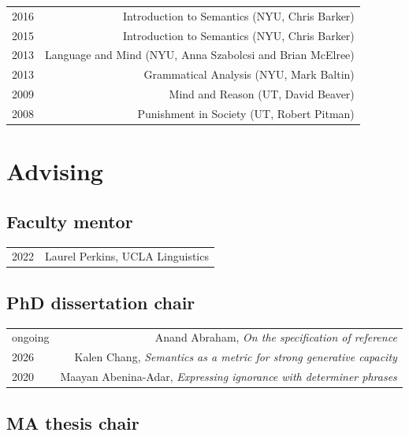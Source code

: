 \documentclass[12pt]{article}
\begin{document}
\begin{longtable}{LR}
  2016 & Introduction to Semantics (NYU, Chris Barker)
         \\
  2015 & Introduction to Semantics (NYU, Chris Barker)
         \\
  2013 & Language and Mind (NYU, Anna Szabolcsi and Brian McElree)
         \\
  2013 & Grammatical Analysis (NYU, Mark Baltin)
         \\
  2009 & Mind and Reason (UT, David Beaver)
         \\
  2008 & Punishment in Society (UT, Robert Pitman)
\end{longtable}


\medskip

\section*{Advising}

\subsection*{Faculty mentor}

\begin{longtable}{LR}
  2022    & Laurel Perkins, UCLA Linguistics
\end{longtable}

\subsection*{PhD dissertation chair}

\begin{longtable}{LR}
  ongoing & Anand Abraham, \textit{On the specification of reference}
  \\
  2026    & Kalen Chang, \textit{Semantics as a metric for strong generative
            capacity}
  \\
  2020    & Maayan Abenina-Adar, \textit{Expressing ignorance with determiner
            phrases}
\end{longtable}

\subsection*{MA thesis chair}
\end{document}
